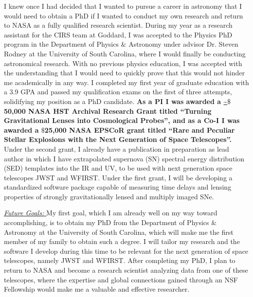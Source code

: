 I  knew once  I  had decided  that  I  wanted to  pursue  a career  in
astronomy that I would need to obtain  a PhD if I wanted to conduct my
own  research  and  return  to  NASA as  a  fully  qualified  research
scientist.  During my  year as a research assistant for  the CIRS team
at  Goddard,  I  was  accepted  to the  Physics  PhD  program  in  the
Department of Physics $\&$ Astronomy  under advisor Dr.  Steven Rodney
at  the  University  of  South  Carolina, where  I  would  finally  be
conducting astronomical research.  With no previous physics education,
I was  accepted with the  understanding that  I would need  to quickly
prove  that this  would  not hinder  me academically  in  any way.   I
completed  my first  year of  graduate education  with a  3.9 GPA  and
passed  my  qualification  exams  on  the  first  of  three  attempts,
solidifying  my position  as  a PhD  candidate. \textbf{As a PI  I was  awarded
a \url{~}$\$$50,000  NASA HST Archival Research  Grant titled ``Turning
Gravitational  Lenses into  Cosmological Probes'',  and as a Co-I I  was
awarded  a $\$$25,000  NASA  EPSCoR grant  titled  ``Rare and  Peculiar
Stellar    Explosions   with    the   Next    Generation   of    Space
Telescopes''.} Under the second  grant, I already have  a publication in
preparation as lead author in which I have extrapolated supernova (SN)
spectral energy distribution (SED) templates into the IR and UV, to be
used with next generation space telescopes JWST and WFIRST.  Under the
first grant,  I will  be developing  a standardized  software package
capable of  measuring time delays  and lensing properties  of strongly
gravitationally lensed and multiply imaged SNe.

\underline{\textit{Future Goals: }}
My first goal, which I am already well on my way toward accomplishing,
is to obtain  my PhD from the Department of  Physics $\&$ Astronomy at
the University of South Carolina, which  will make me the first member
of my family  to obtain such a  degree. I will tailor  my research and
the software  I develop during this  time to be relevant  for the next
generation  of  space  telescopes,  namely  JWST  and  WFIRST.   After
completing my  PhD, I  plan to  return to NASA  and become  a research
scientist  analyzing data  from  one of  these  telescopes, where  the
expertise  and global  connections  gained through  an NSF  Fellowship
would make me a valuable and effective researcher.


